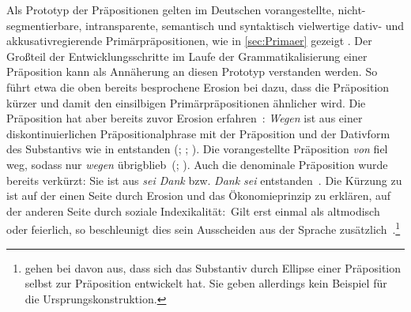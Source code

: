 Als Prototyp der Präpositionen gelten im Deutschen vorangestellte, nicht-segmentierbare, intransparente, semantisch und syntaktisch vielwertige dativ- und akkusativregierende Primärpräpositionen, wie in \autoref{sec:Primaer} gezeigt \citep[s.][42]{Szczepaniak2014}. 
Der Großteil der Entwicklungsschritte im Laufe der Grammatikalisierung einer Präposition kann als Annäherung an diesen Prototyp verstanden werden. 
So führt etwa die oben bereits besprochene Erosion bei  dazu, dass die Präposition kürzer und damit den einsilbigen Primärpräpositionen ähnlicher wird. 
Die Präposition hat aber bereits zuvor Erosion erfahren~\citep[s.][211]{DiMeola2003}: 
\textit{Wegen }ist aus einer diskontinuierlichen Pr{\"a}positionalphrase mit der Präposition  und der Dativform des Substantivs  wie in entstanden (\citealp[s.][304]{Braunmueller1985}; \citealp[50]{Meibauer1995}; \citealp[98]{Szczepaniak2011}). 
Die vorangestellte Pr{\"a}position \textit{von }fiel weg, sodass nur \textit{wegen }{\"u}brigblieb~(\citealp[s.][31]{Lehmann1992}; \citealp[210]{DiMeola2003}). 
Auch die denominale Präposition  wurde bereits verkürzt: 
Sie ist aus \textit{sei Dank }bzw. \textit{Dank sei } entstanden~\citep[s.][65]{Lindqvist1994}.
Die Kürzung zu  ist auf der einen Seite durch Erosion und das {\"O}konomieprinzip zu erklären, auf der anderen Seite durch soziale Indexikalit{\"a}t:~{\glqq}Gilt  erst einmal als altmodisch oder feierlich, so beschleunigt dies sein Ausscheiden aus der Sprache zus{\"a}tzlich{\grqq}~\citep[302]{Lindqvist1994}.\footnote{\citet[2075]{Zifonun1997} gehen bei  davon aus, dass sich das Substantiv durch Ellipse einer Pr{\"a}position selbst zur Pr{\"a}position entwickelt hat. Sie geben allerdings kein Beispiel f{\"u}r die Ursprungskonstruktion.} 

